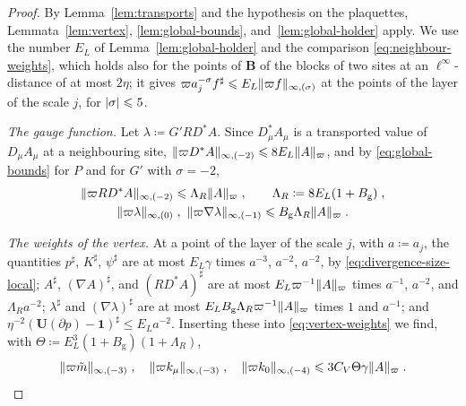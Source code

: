 \documentclass[11pt]{preprint}
\newcommand{\id}{\mathbf 1}
\DeclarePairedDelimiter{\abs}{\lvert}{\rvert}
\DeclarePairedDelimiter{\norm}{\lVert}{\rVert}
\numberwithin{equation}{section}
\begin{document}
\begin{proof}
By Lemma~\ref{lem:transports} and the hypothesis on the plaquettes, Lemmata~\ref{lem:vertex}, \ref{lem:global-bounds}, and~\ref{lem:global-holder} apply. We use the number $E_L$ of Lemma~\ref{lem:global-holder} and the comparison \eqref{eq:neighbour-weights}, which holds also for the points of $\mathbf B$ of the blocks of two sites at an $\ell^\infty$-distance of at most $2\eta$; it gives $\varpi a_j^{-\sigma}f^\sharp \leqslant E_L\norm{\varpi f}_{\infty,(\sigma)}$ at the points of the layer of the scale $j$, for $\abs\sigma \leqslant 5$.

\emph{The gauge function.} Let $\lambda \coloneqq G'RD^*A$. Since $D^*_\mu A_\mu$ is a transported value of $D_\mu A_\mu$ at a neighbouring site, $\norm{\varpi D^*A}_{\infty,(-2)} \leqslant 8E_L\norm A_\varpi$, and by \eqref{eq:global-bounds} for $P$ and for $G'$ with $\sigma = -2$,
\begin{gather*}
    \norm{\varpi RD^*A}_{\infty,(-2)} \leqslant \Lambda_R\norm A_\varpi\;,
    \qquad
    \Lambda_R \coloneqq 8E_L(1 + B_{\mathrm g})\;,\\
    \norm{\varpi\lambda}_{\infty,(0)}\;,\ \norm{\varpi\nabla\lambda}_{\infty,(-1)} \leqslant B_{\mathrm g}\Lambda_R\norm A_\varpi\;.
\end{gather*}

\emph{The weights of the vertex.} At a point of the layer of the scale $j$, with $a \coloneqq a_j$, the quantities $p^\sharp$, $K^\sharp$, $\psi^\sharp$ are at most $E_L\gamma$ times $a^{-3}$, $a^{-2}$, $a^{-2}$, by \eqref{eq:divergence-size-local}; $A^\sharp$, $(\nabla A)^\sharp$, and $(RD^*A)^\sharp$ are at most $E_L\varpi^{-1}\norm A_\varpi$ times $a^{-1}$, $a^{-2}$, and $\Lambda_Ra^{-2}$; $\lambda^\sharp$ and $(\nabla\lambda)^\sharp$ are at most $E_LB_{\mathrm g}\Lambda_R\varpi^{-1}\norm A_\varpi$ times $1$ and $a^{-1}$; and $\eta^{-2}(\mathbf U(\partial p) - \id)^\sharp \leqslant E_La^{-2}$. Inserting these into \eqref{eq:vertex-weights} we find, with $\Theta \coloneqq E_L^3(1 + B_{\mathrm g})(1 + \Lambda_R)$,
\begin{equation}\label{eq:vertex-sizes}
    \norm{\varpi\tilde m}_{\infty,(-3)}\;,\quad
    \norm{\varpi k_\mu}_{\infty,(-3)}\;,\quad
    \norm{\varpi k_0}_{\infty,(-4)} \leqslant 3C_V\Theta\gamma\norm A_\varpi\;.
\end{equation}


\end{proof}
\end{document}
